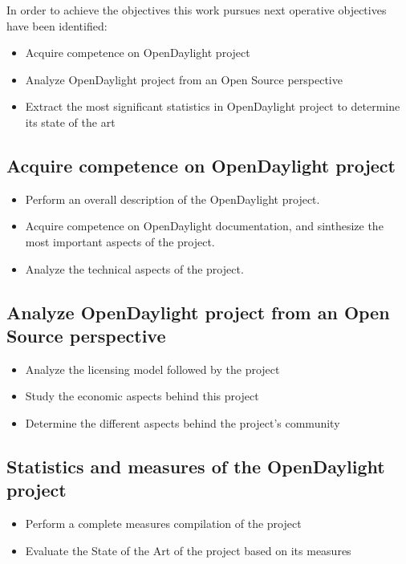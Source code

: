 \documentclass[a4paper, 12pt]{book}
\begin{document}
In order to achieve the objectives this work pursues next operative objectives have been identified:

\begin{itemize}
\item{Acquire competence on OpenDaylight project}
\item{Analyze OpenDaylight project from an Open Source perspective}
\item{Extract the most significant statistics in OpenDaylight project to determine its state of the art}
\end{itemize}

\subsection{Acquire competence on OpenDaylight project}
\begin{itemize}
 \item Perform an overall description of the OpenDaylight project.
 \item Acquire competence on OpenDaylight documentation, and sinthesize the most important aspects of the project.
 \item Analyze the technical aspects of the project.
\end{itemize}

\subsection{Analyze OpenDaylight project from an Open Source perspective}
\begin{itemize}
 \item Analyze the licensing model followed by the project
 \item Study the economic aspects behind this project
 \item Determine the different aspects behind the project's community
\end{itemize}

\subsection{Statistics and measures of the OpenDaylight project}
\begin{itemize}
 \item Perform a complete measures compilation of the project
 \item Evaluate the State of the Art of the project based on its measures
\end{itemize}
\end{document}
